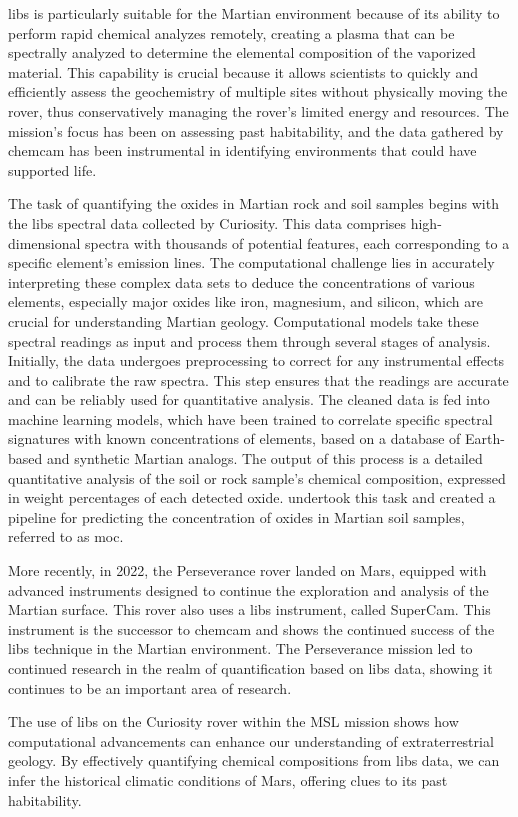 \gls{libs} is particularly suitable for the Martian environment because of its ability to perform rapid chemical analyzes remotely, creating a plasma that can be spectrally analyzed to determine the elemental composition of the vaporized material. This capability is crucial because it allows scientists to quickly and efficiently assess the geochemistry of multiple sites without physically moving the rover, thus conservatively managing the rover's limited energy and resources. The mission's focus has been on assessing past habitability, and the data gathered by \gls{chemcam} has been instrumental in identifying environments that could have supported life\cite{chemcamNasaWebsite,curiosityNasaWebsite}.

The task of quantifying the oxides in Martian rock and soil samples begins with the \gls{libs} spectral data collected by Curiosity. This data comprises high-dimensional spectra with thousands of potential features, each corresponding to a specific element's emission lines. The computational challenge lies in accurately interpreting these complex data sets to deduce the concentrations of various elements, especially major oxides like iron, magnesium, and silicon, which are crucial for understanding Martian geology.
Computational models take these spectral readings as input and process them through several stages of analysis. Initially, the data undergoes preprocessing to correct for any instrumental effects and to calibrate the raw spectra. This step ensures that the readings are accurate and can be reliably used for quantitative analysis. 
The cleaned data is fed into machine learning models, which have been trained to correlate specific spectral signatures with known concentrations of elements, based on a database of Earth-based and synthetic Martian analogs.
The output of this process is a detailed quantitative analysis of the soil or rock sample's chemical composition, expressed in weight percentages of each detected oxide\cite{wiensPreflightCalibrationInitial2013, cleggRecalibrationMarsScience2017}.
\citet{cleggRecalibrationMarsScience2017} undertook this task and created a pipeline for predicting the concentration of oxides in Martian soil samples, referred to as \gls{moc}.

More recently, in 2022, the Perseverance rover landed on Mars, equipped with advanced instruments designed to continue the exploration and analysis of the Martian surface. This rover also uses a \gls{libs} instrument, called SuperCam. This instrument is the successor to \gls{chemcam} and shows the continued success of the \gls{libs} technique in the Martian environment. The Perseverance mission led to continued research in the realm of quantification based on \gls{libs} data\cite{andersonPostlandingMajorElement2022}, showing it continues to be an important area of research.

The use of \gls{libs} on the Curiosity rover within the MSL mission shows how computational advancements can enhance our understanding of extraterrestrial geology. By effectively quantifying chemical compositions from \gls{libs} data, we can infer the historical climatic conditions of Mars, offering clues to its past habitability.
